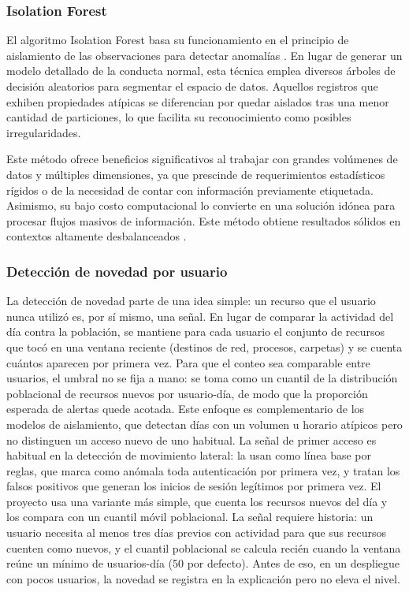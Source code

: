 \subsubsection{Isolation Forest}
El algoritmo Isolation Forest basa su funcionamiento en el principio de aislamiento de las observaciones para detectar anomalías \parencite{Liu2008}. En lugar de generar un modelo detallado de la conducta normal, esta técnica emplea diversos árboles de decisión aleatorios para segmentar el espacio de datos. Aquellos registros que exhiben propiedades atípicas se diferencian por quedar aislados tras una menor cantidad de particiones, lo que facilita su reconocimiento como posibles irregularidades.

Este método ofrece beneficios significativos al trabajar con grandes volúmenes de datos y múltiples dimensiones, ya que prescinde de requerimientos estadísticos rígidos o de la necesidad de contar con información previamente etiquetada. Asimismo, su bajo costo computacional lo convierte en una solución idónea para procesar flujos masivos de información. Este método obtiene resultados sólidos en contextos altamente desbalanceados \parencite{AlShehari2023}.

\subsubsection{Detección de novedad por usuario}
La detección de novedad parte de una idea simple: un recurso que el usuario nunca utilizó es, por sí mismo, una señal. En lugar de comparar la actividad del día contra la población, se mantiene para cada usuario el conjunto de recursos que tocó en una ventana reciente (destinos de red, procesos, carpetas) y se cuenta cuántos aparecen por primera vez. Para que el conteo sea comparable entre usuarios, el umbral no se fija a mano: se toma como un cuantil de la distribución poblacional de recursos nuevos por usuario-día, de modo que la proporción esperada de alertas quede acotada. Este enfoque es complementario de los modelos de aislamiento, que detectan días con un volumen u horario atípicos pero no distinguen un acceso nuevo de uno habitual. La señal de primer acceso es habitual en la detección de movimiento lateral: \textcite{Bowman2020} la usan como línea base por reglas, que marca como anómala toda autenticación por primera vez, y \textcite{Ho2021Hopper} tratan los falsos positivos que generan los inicios de sesión legítimos por primera vez. El proyecto usa una variante más simple, que cuenta los recursos nuevos del día y los compara con un cuantil móvil poblacional. La señal requiere historia: un usuario necesita al menos tres días previos con actividad para que sus recursos cuenten como nuevos, y el cuantil poblacional se calcula recién cuando la ventana reúne un mínimo de usuarios-día (50 por defecto). Antes de eso, en un despliegue con pocos usuarios, la novedad se registra en la explicación pero no eleva el nivel.

